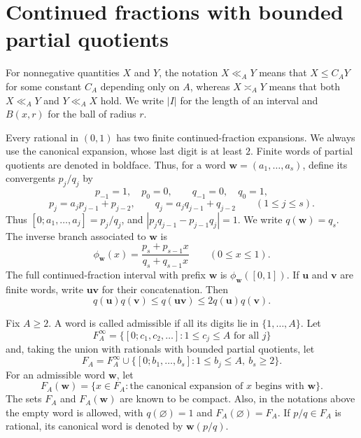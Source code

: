 \documentclass[11pt]{amsart}
\begin{document}
\section{Continued fractions with bounded partial quotients}\label{sec:continued-fractions}

For nonnegative quantities $X$ and $Y$, the notation $X\ll_A Y$ means
that $X\le C_A Y$ for some constant $C_A$ depending only on $A$, whereas $X\asymp_A Y$ means
that both $X\ll_A Y$ and $Y\ll_A X$ hold.  We write $|I|$ for the length of an interval and
$B(x,r)$ for the ball of radius $r$.

Every rational in $(0,1)$ has two finite continued-fraction expansions.  We
always use the canonical expansion, whose last digit is at least $2$.
Finite words of partial quotients are denoted in boldface.  Thus, for a word
$\mathbf{w}=(a_1,\ldots,a_s)$, define its convergents $p_j/q_j$ by
$$
 p_{-1}=1,\quad p_0=0,\qquad
 q_{-1}=0,\quad q_0=1,
$$
$$
 p_j=a_jp_{j-1}+p_{j-2},\qquad
 q_j=a_jq_{j-1}+q_{j-2}\qquad(1\le j\le s).
$$
Thus $[0;a_1,\ldots,a_j]=p_j/q_j$, and
$|p_jq_{j-1}-p_{j-1}q_j|=1$.  We write $q(\mathbf{w})=q_s$.  The inverse branch
associated to $\mathbf{w}$ is
\begin{equation}\label{eq:inverse-branch}
 \phi_{\mathbf{w}}(x)=\frac{p_s+p_{s-1}x}{q_s+q_{s-1}x}\qquad(0\le x\le1).
\end{equation}
The full continued-fraction interval with prefix $\mathbf{w}$ is
$\phi_{\mathbf{w}}([0,1])$.  If $\mathbf{u}$ and $\mathbf{v}$ are finite words, write $\mathbf{u}\mathbf{v}$ for their concatenation.  Then
\begin{equation}\label{eq:continuant-concatenation}
 q(\mathbf{u})q(\mathbf{v})\le q(\mathbf{u}\mathbf{v})\le 2q(\mathbf{u})q(\mathbf{v}).
\end{equation}


Fix $A\ge2$.  A word is called admissible if all its digits lie in
$\{1,\ldots,A\}$.  Let
$$
 F_A^\infty=\{[0;c_1,c_2,\ldots]:1\le c_j\le A\text{ for all }j\}
$$
and, taking the union with rationals with bounded partial quotients, let
$$
 F_A=F_A^\infty\cup
 \{[0;b_1,\ldots,b_s]:1\le b_j\le A,\ b_s\ge2\}.
$$
For an admissible word $\mathbf{w}$, let
$$
 F_A(\mathbf{w})=\{x\in F_A:\text{the canonical expansion of $x$ begins with }\mathbf{w}\}.
$$
The sets $F_A$ and $F_A(\mathbf{w})$ are known to be compact.  Also, in the notations above the empty word is allowed, with
$q(\varnothing)=1$ and $F_A(\varnothing)=F_A$.  If $p/q\in F_A$ is rational, its canonical word is
denoted by $\mathbf{w}(p/q)$.
\end{document}
